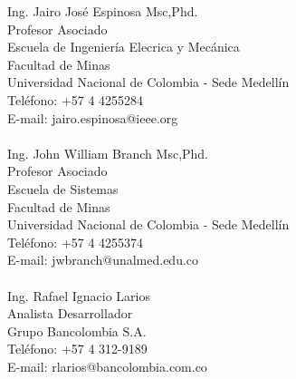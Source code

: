 \begin{resume}
Ing. Jairo Jos\'{e} Espinosa Msc,Phd.\\
Profesor Asociado \\
Escuela de Ingenier\'{i}a Elecrica y Mec\'{a}nica \\
Facultad de Minas \\
Universidad Nacional de Colombia - Sede  Medell\'{i}n\\
Tel\'{e}fono: +57 4 4255284 \\
E-mail: jairo.espinosa@ieee.org\\
\\  
Ing. John William Branch Msc,Phd.\\
Profesor Asociado \\
Escuela de Sistemas \\
Facultad de Minas \\
Universidad Nacional de Colombia - Sede  Medell\'{i}n\\
Tel\'{e}fono: +57 4 4255374 \\
E-mail: jwbranch@unalmed.edu.co\\
\\  
Ing. Rafael Ignacio Larios\\
Analista Desarrollador \\
Grupo Bancolombia S.A. \\
Tel\'{e}fono: +57 4 312-9189  \\
E-mail: rlarios@bancolombia.com.co 


\end{resume}


